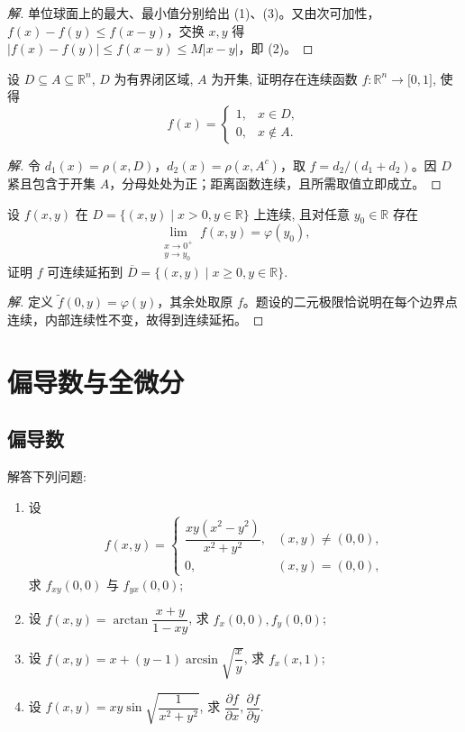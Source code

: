 \documentclass[../../数学分析培优讲义(答案版).tex]{subfiles}
\begin{document}
\begin{proof}[解]
单位球面上的最大、最小值分别给出 (1)、(3)。又由次可加性，$f(x)-f(y)\leq f(x-y)$，交换 $x,y$ 得 $|f(x)-f(y)|\leq f(x-y)\leq M|x-y|$，即 (2)。
\end{proof}

\begin{example}
设 $D\subseteq A\subseteq\mathbb{R}^n$, $D$ 为有界闭区域, $A$ 为开集, 证明存在连续函数 $f:\mathbb{R}^n\to\lbrack0,1\rbrack$, 使得
\[
    f(x)=
    \begin{cases}
        1, & x\in D,\\
        0, & x\notin A.
    \end{cases}
\]
\end{example}

\begin{proof}[解]
令 $d_1(x)=\rho(x,D)$，$d_2(x)=\rho(x,A^c)$，取 $f=d_2/(d_1+d_2)$。因 $D$ 紧且包含于开集 $A$，分母处处为正；距离函数连续，且所需取值立即成立。
\end{proof}

\begin{example}
设 $f(x,y)$ 在 $D=\{(x,y)\mid x>0,y\in\mathbb{R}\}$ 上连续, 且对任意 $y_0\in\mathbb{R}$ 存在
\[
    \lim\limits_{\substack{x\to0^+\\y\to y_0}}f(x,y)=\varphi(y_0),
\]
证明 $f$ 可连续延拓到 $\overline D=\{(x,y)\mid x\geq0,y\in\mathbb{R}\}$.
\end{example}

\begin{proof}[解]
定义 $\widetilde f(0,y)=\varphi(y)$，其余处取原 $f$。题设的二元极限恰说明在每个边界点连续，内部连续性不变，故得到连续延拓。
\end{proof}

\newpage

\section{偏导数与全微分}

\subsection{偏导数}

\begin{example}
解答下列问题:
\begin{enumerate}[label=(\arabic*)]
    \item 设
    \[
        f(x,y)=
        \begin{cases}
            \dfrac{xy(x^2-y^2)}{x^2+y^2}, & (x,y)\ne(0,0),\\
            0, & (x,y)=(0,0),
        \end{cases}
    \]
    求 $f_{xy}(0,0)$ 与 $f_{yx}(0,0)$;
    \item 设 $\displaystyle f(x,y)=\arctan\dfrac{x+y}{1-xy}$, 求 $f_x(0,0),f_y(0,0)$;
    \item 设 $\displaystyle f(x,y)=x+(y-1)\arcsin\sqrt{\dfrac{x}{y}}$, 求 $f_x(x,1)$;
    \item 设 $\displaystyle f(x,y)=xy\sin\sqrt{\dfrac{1}{x^2+y^2}}$, 求 $\dfrac{\partial f}{\partial x},\dfrac{\partial f}{\partial y}$.
\end{enumerate}
\end{example}
\end{document}
